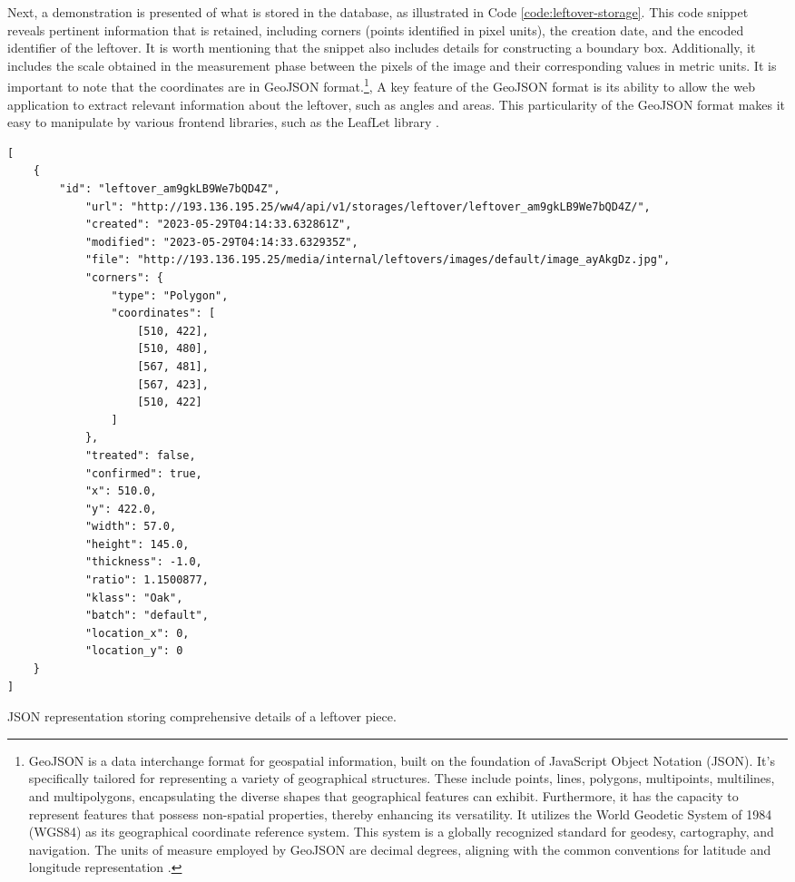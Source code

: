 Next, a demonstration is presented of what is stored in the database, as illustrated in Code \ref{code:leftover-storage}. This code snippet reveals pertinent information that is retained, including corners (points identified in pixel units), the creation date, and the encoded identifier of the leftover. It is worth mentioning that the snippet also includes details for constructing a boundary box. Additionally, it includes the scale obtained in the measurement phase between the pixels of the image and their corresponding values in metric units. It is important to note that the coordinates are in GeoJSON format.\footnote{GeoJSON is a data interchange format for geospatial information, built on the foundation of JavaScript Object Notation (JSON). It's specifically tailored for representing a variety of geographical structures. These include points, lines, polygons, multipoints, multilines, and multipolygons, encapsulating the diverse shapes that geographical features can exhibit. Furthermore, it has the capacity to represent features that possess non-spatial properties, thereby enhancing its versatility. It utilizes the World Geodetic System of 1984 (WGS84) as its geographical coordinate reference system. This system is a globally recognized standard for geodesy, cartography, and navigation. The units of measure employed by GeoJSON are decimal degrees, aligning with the common conventions for latitude and longitude representation \cite{butler2016geojson}. }, A key feature of the GeoJSON format is its ability to allow the web application to extract relevant information about the leftover, such as angles and areas. This particularity of the GeoJSON format makes it easy to manipulate by various frontend libraries, such as the LeafLet library \cite{paullecam_paullecamreact-leaflet_nodate}. 

\begin{listing}[!ht]
    \begin{verbatim}
[
    {
        "id": "leftover_am9gkLB9We7bQD4Z",
            "url": "http://193.136.195.25/ww4/api/v1/storages/leftover/leftover_am9gkLB9We7bQD4Z/",
            "created": "2023-05-29T04:14:33.632861Z",
            "modified": "2023-05-29T04:14:33.632935Z",
            "file": "http://193.136.195.25/media/internal/leftovers/images/default/image_ayAkgDz.jpg",
            "corners": {
                "type": "Polygon",
                "coordinates": [
                    [510, 422],
                    [510, 480],
                    [567, 481],
                    [567, 423],
                    [510, 422]
                ]
            },
            "treated": false,
            "confirmed": true,
            "x": 510.0,
            "y": 422.0,
            "width": 57.0,
            "height": 145.0,
            "thickness": -1.0,
            "ratio": 1.1500877,
            "klass": "Oak",
            "batch": "default",
            "location_x": 0,
            "location_y": 0
    }
]
\end{verbatim}
\caption{JSON representation storing comprehensive details of a leftover piece.}
\label{code:leftover-storage}
\end{listing}
